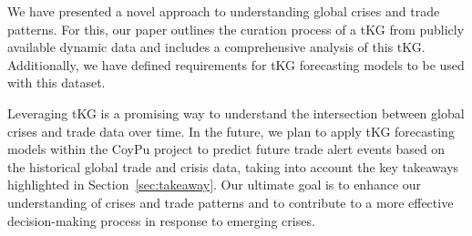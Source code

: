 We have presented a novel approach to understanding global crises and trade patterns. For this, our paper outlines the curation process of a tKG from publicly available dynamic data and includes a comprehensive analysis of this tKG. 
Additionally, we have defined requirements for tKG forecasting models to be used with this dataset.

Leveraging tKG is a promising way to understand the intersection between global crises and trade data over time. 
In the future, we plan to apply tKG forecasting models within the CoyPu project to predict future trade alert events based on the historical global trade and crisis data, taking into account the key takeaways highlighted in Section~\ref{sec:takeaway}. 
Our ultimate goal is to enhance our understanding of crises and trade patterns and to contribute to a more effective decision-making process in response to emerging crises.

